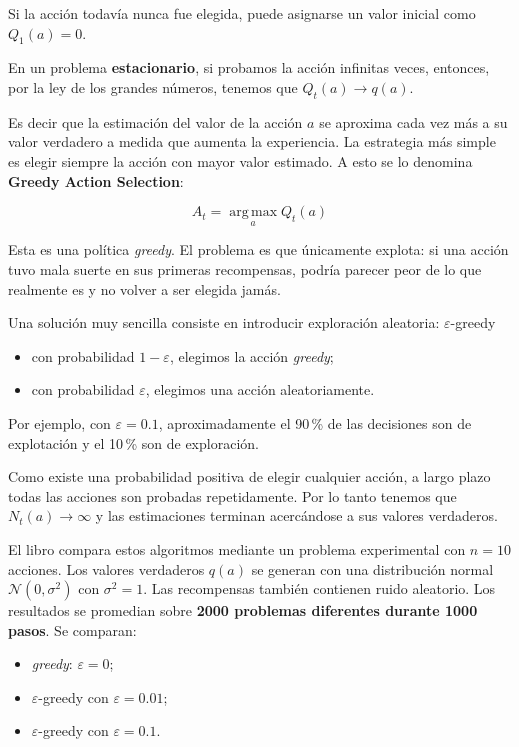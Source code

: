 \documentclass[11pt,a4paper]{article}
\newcommand{\argmax}{\operatorname*{arg\,max}}
\begin{document}
Si la acción todavía nunca fue elegida, puede asignarse un valor inicial como $Q_1(a)=0$.

En un problema \textbf{estacionario}, si probamos la acción infinitas veces,
entonces, por la ley de los grandes números, tenemos que $Q_t(a)\longrightarrow q(a)$.

Es decir que la estimación del valor de la acción $a$ se aproxima cada vez más a su valor verdadero a medida que aumenta la experiencia. La estrategia más simple es elegir siempre la acción con mayor valor estimado. A esto se lo denomina
\textbf{Greedy Action Selection}:

\begin{equation}
  A_t=\argmax_a Q_t(a) 
\end{equation}
  
Esta es una política \textit{greedy}. El problema es que únicamente explota:
si una acción tuvo mala suerte en sus primeras recompensas, podría parecer peor
de lo que realmente es y no volver a ser elegida jamás.

Una solución muy sencilla consiste en introducir exploración aleatoria: \texorpdfstring{$\varepsilon$}{epsilon}-greedy

\begin{itemize}
  \item con probabilidad $1-\varepsilon$, elegimos la acción \textit{greedy};
  \item con probabilidad $\varepsilon$, elegimos una acción aleatoriamente.
\end{itemize}

Por ejemplo, con $\varepsilon=0.1$, aproximadamente el 90\,\% de las decisiones
son de explotación y el 10\,\% son de exploración.

Como existe una probabilidad positiva de elegir cualquier acción, a largo plazo
todas las acciones son probadas repetidamente. Por lo tanto tenemos que $N_t(a)\longrightarrow\infty$ y las estimaciones terminan acercándose a sus valores verdaderos.

El libro compara estos algoritmos mediante un problema experimental con $n=10$
acciones. Los valores verdaderos $q(a)$ se generan con una distribución normal $\mathcal{N}(0, \sigma^2)$ con $\sigma^2 = 1$. Las recompensas también contienen ruido aleatorio. Los resultados se promedian sobre \textbf{2000 problemas diferentes durante 1000 pasos}. Se comparan:

\begin{itemize}
  \item \textit{greedy}: $\varepsilon=0$;
  \item $\varepsilon$-greedy con $\varepsilon=0.01$;
  \item $\varepsilon$-greedy con $\varepsilon=0.1$.
\end{itemize}
\end{document}
